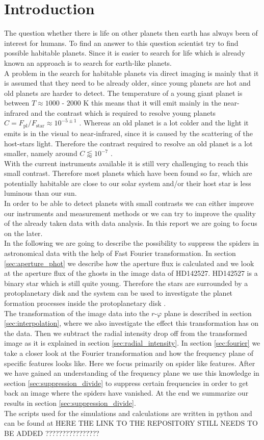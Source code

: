 \section{Introduction}
The question whether there is life on other planets then earth has always been of interest for humans. To find an answer to this question scientist try to find possible habitable planets. Since it is easier to search for life which is already known an approach is to search for earth-like planets.\\
A problem in the search for habitable planets via direct imaging is mainly that it is assumed that they need to be already older, since young planets are hot and old planets are harder to detect. The temperature of a young giant planet is between $T \approx 1000$ - $2000$ K this means that it will emit mainly in the near-infrared and the contrast which is required to resolve young planets $C = F_{\mathrm{pl}}/F_{\mathrm{star}} \approx 10^{-5 \pm 1}$ \cite{Hunziker2020}. Whereas an old planet is a lot colder and the light it emits is in the visual to near-infrared, since it is caused by the scattering of the host-stars light. Therefore the contrast required to resolve an old planet is a lot smaller, namely around $C \lessapprox 10^{-7}$ \cite{Hunziker2020}.\\
With the current instruments available it is still very challenging to reach this small contrast. Therefore most planets which have been found so far, which are potentially habitable are close to our solar system and/or their host star is less luminous than our sun.\\
In order to be able to detect planets with small contrasts we can either improve our instruments and measurement methods or we can try to improve the quality of the already taken data with data analysis. In this report we are going to focus on the later. \\
In the following we are going to describe the possibility to suppress the spiders in astronomical data with the help of Fast Fourier transformation. In section \ref{sec:aperture_phot} we describe how the aperture flux is calculated and we look at the aperture flux of the ghosts in the image data of HD142527. HD142527 is a binary star which is still quite young. Therefore the stars are surrounded by a protoplanetary disk and the system can be used to investigate the planet formation processes inside the protoplanetary disk \cite{HD142527}.\\
The transformation of the image data into the $r$-$\varphi$ plane is described in section \ref{sec:interpolation}, where we also investigate the effect this transformation has on the data. Then we subtract the radial intensity drop off from the transformed image as it is explained in section \ref{sec:radial_intensity}. In section \ref{sec:fourier} we take a closer look at the Fourier transformation and how the frequency plane of specific features looks like. Here we focus primarily on spider like features. After we have gained an understanding of the frequency plane we use this knowledge in section \ref{sec:suppression_divide} to suppress certain frequencies in order to get back an image where the spiders have vanished. At the end we summarize our results in section \ref{sec:suppression_divide}.\\
The scripts used for the simulations and calculations are written in python and can be found 
at HERE THE LINK TO THE REPOSITORY STILL NEEDS TO BE ADDED ????????????????

